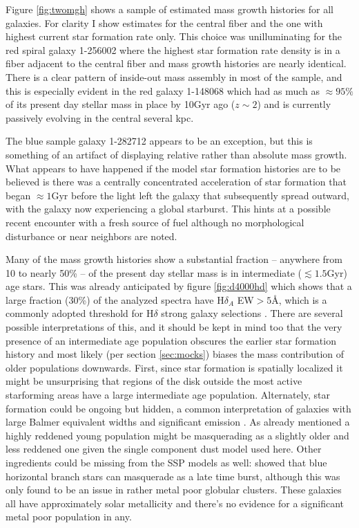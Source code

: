 \documentclass[modern]{aastex62}
\begin{document}
Figure \ref{fig:twomgh} shows a sample of estimated mass growth histories for all galaxies. For clarity I show estimates for the central fiber and the one with highest current star formation rate only. This choice was unilluminating for the red spiral galaxy 1-256002 where the highest star formation rate density is in a fiber adjacent to the central fiber and mass growth histories are nearly identical. There is a clear pattern of inside-out mass assembly \citep{2013ApJ...764L...1P, 2016A&A...590A..44G} in most of the sample, and this is especially evident in the red galaxy 1-148068 which had as much as $\approx 95\%$ of its present day stellar mass in place by 10Gyr ago ($z \sim 2$) and is currently passively evolving in the central several kpc. 

The blue sample galaxy 1-282712 appears to be an exception, but this is something of an artifact of displaying relative rather than absolute mass growth. What appears to have happened if the model star formation histories are to be believed is there was a centrally concentrated acceleration of star formation that began $\approx 1$Gyr before the light left the galaxy that subsequently spread outward, with the galaxy now experiencing a global starburst. This hints at a possible recent encounter with a fresh source of fuel although no morphological disturbance or near neighbors are noted.

Many of the mass growth histories show a substantial fraction -- anywhere from 10 to nearly 50\% -- of the present day stellar mass is in intermediate ($\lesssim 1.5$Gyr) age stars. This was already anticipated by figure \ref{fig:d4000hd} which shows that a large fraction (30\%) of the analyzed spectra have H$\delta_A$ EW$> 5$\AA, which is a commonly adopted threshold for H$\delta$ strong galaxy selections \citep{2003PASJ...55..771G}. There are several possible interpretations of this, and it should be kept in mind too that the very presence of an intermediate age population obscures the earlier star formation history and most likely (per section \ref{sec:mocks}) biases the mass contribution of older populations downwards. First, since star formation is spatially localized it might be unsurprising that regions of the disk outside the most active starforming areas have a large intermediate age population. Alternately, star formation could be ongoing but hidden, a common interpretation of galaxies with large Balmer equivalent widths and significant emission \citep{1999ApJ...518..576P}. As already mentioned a highly reddened young population might be masquerading as a slightly older and less reddened one given the single component dust model used here. Other ingredients could be missing from the SSP models as well: \citet{2010ApJ...709...88O} showed that blue horizontal branch stars can masquerade as a late time burst, although this was only found to be an issue in rather metal poor globular clusters. These galaxies all have approximately solar metallicity and there's no evidence for a significant metal poor population in any.
\end{document}
